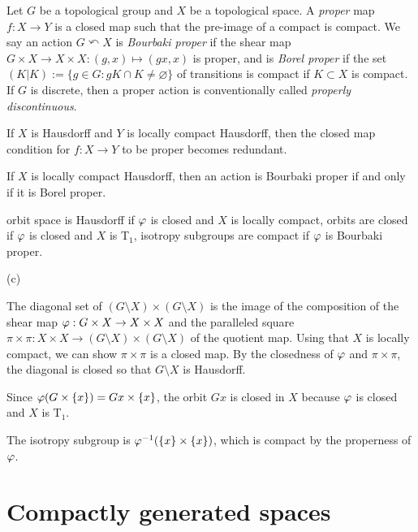 \documentclass{../../large}
\begin{document}
\begin{prb}
Let $G$ be a topological group and $X$ be a topological space.
A \emph{proper} map $f:X\to Y$ is a closed map such that the pre-image of a compact is compact.
We say an action $G\curvearrowleft X$ is \emph{Bourbaki proper} if the shear map $G\times X\to X\times X:(g,x)\mapsto(gx,x)$ is proper, and is \emph{Borel proper} if the set $(K|K):=\{g\in G:gK\cap K\ne\varnothing\}$ of transitions is compact if $K\subset X$ is compact.
If $G$ is discrete, then a proper action is conventionally called \emph{properly discontinuous}.
\begin{parts}
\item If $X$ is Hausdorff and $Y$ is locally compact Hausdorff, then the closed map condition for $f:X\to Y$ to be proper becomes redundant.
\item If $X$ is locally compact Hausdorff, then an action is Bourbaki proper if and only if it is Borel proper.
\item orbit space is Hausdorff if $\varphi$ is closed and $X$ is locally compact, orbits are closed if $\varphi$ is closed and $X$ is T$_1$, isotropy subgroups are compact if $\varphi$ is Bourbaki proper.
\end{parts}
\end{prb}
\begin{pf}
(c)

The diagonal set of $(G\setminus X)\times(G\setminus X)$ is the image of the composition of the shear map $\varphi:G\times X\to X\times X$ and the paralleled square $\pi\times\pi:X\times X\to(G\setminus X)\times(G\setminus X)$ of the quotient map.
Using that $X$ is locally compact, we can show $\pi\times\pi$ is a closed map.
By the closedness of $\varphi$ and $\pi\times\pi$, the diagonal is closed so that $G\setminus X$ is Hausdorff.

Since $\varphi(G\times\{x\})=Gx\times\{x\}$, the orbit $Gx$ is closed in $X$ because $\varphi$ is closed and $X$ is T$_1$.

The isotropy subgroup is $\varphi^{-1}(\{x\}\times\{x\})$, which is compact by the properness of $\varphi$.
\end{pf}



\chapter{Compactly generated spaces}

\section{}
\end{document}
